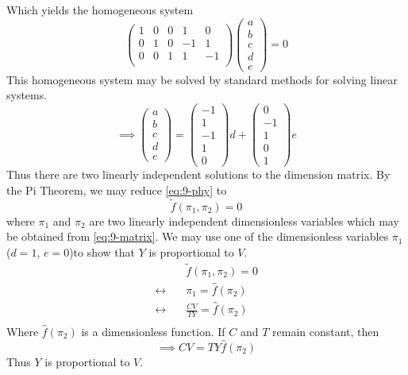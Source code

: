 \documentclass[12pt]{article}
\begin{document}
  Which yields the homogeneous system
  \begin{equation*}
    \begin{pmatrix}
      1 & 0 & 0 & 1 & 0 \\
      0 & 1 & 0 & -1 & 1 \\
      0 & 0 & 1 & 1 & -1 \\
    \end{pmatrix}
    \begin{pmatrix}
      a \\ b \\ c \\ d \\ e
    \end{pmatrix} = 0
  \end{equation*}
  This homogeneous system may be solved by standard methods for solving linear
  systems.
  \begin{equation}
    \label{eq:9-matrix}
    \implies
    \begin{pmatrix}
      a \\ b \\ c \\ d \\ e
    \end{pmatrix}
    =
    \begin{pmatrix}
      -1 \\ 1 \\ -1 \\ 1 \\ 0
    \end{pmatrix}d +
    \begin{pmatrix}
      0 \\ -1 \\ 1 \\ 0 \\ 1
    \end{pmatrix}e
  \end{equation}
  Thus there are two linearly independent solutions to the dimension matrix.
  By the Pi Theorem, we may reduce \cref{eq:9-phy} to
  \begin{equation}
    \tilde{f}(\pi_1, \pi_2) = 0
  \end{equation}
  where $\pi_1$ and $\pi_2$ are two linearly independent dimensionless variables
  which may be obtained from \cref{eq:9-matrix}. We may use one of the
  dimensionless variables $\pi_1$ ($d=1$, $e=0$)to show that $Y$ is proportional
  to $V$.
  \begin{equation*}
    \begin{aligned}
      &\tilde{f}(\pi_1,\pi_2)= 0 \\
      \leftrightarrow\quad& \pi_1 = \hat{f}(\pi_2) \\
      \leftrightarrow\quad& \frac{CV}{TY} = \hat{f}(\pi_2) \\
    \end{aligned}
  \end{equation*}
  Where $\hat{f}(\pi_2)$ is a dimensionless function. If $C$ and $T$ remain
  constant, then
  \begin{equation}
    \label{eq:9-prop}
    \boxed{
      \implies CV = TY\hat{f}(\pi_2)
    }
  \end{equation}
  Thus $Y$ is proportional to $V$.
\end{document}
